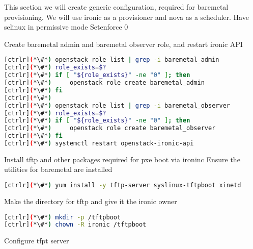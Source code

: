 This section we will create generic configuration, required for baremetal provisioning. We will use ironic as a provisioner and nova as a scheduler.
Have selinux in permissive mode
Setenforce 0

Create baremetal admin and baremetal observer role, and restart ironic API

\begin{lstlisting}[language=bash,keywords={}]
[ctrlr](*\#*) openstack role list | grep -i baremetal_admin
[ctrlr](*\#*) role_exists=$?
[ctrlr](*\#*) if [ "${role_exists}" -ne "0" ]; then 
[ctrlr](*\#*)     openstack role create baremetal_admin
[ctrlr](*\#*) fi
[ctrlr](*\#*) 
[ctrlr](*\#*) openstack role list | grep -i baremetal_observer 
[ctrlr](*\#*) role_exists=$?
[ctrlr](*\#*) if [ "${role_exists}" -ne "0" ]; then
[ctrlr](*\#*)     openstack role create baremetal_observer
[ctrlr](*\#*) fi
[ctrlr](*\#*) systemctl restart openstack-ironic-api
\end{lstlisting}

Install tftp and other packages required for pxe boot via ironinc
Ensure the utilities for baremetal are installed

\begin{lstlisting}[language=bash,keywords={}]
[ctrlr](*\#*) yum install -y tftp-server syslinux-tftpboot xinetd
\end{lstlisting}

Make the directory for tftp and give it the ironic owner

\begin{lstlisting}[language=bash,keywords={}]
[ctrlr](*\#*) mkdir -p /tftpboot
[ctrlr](*\#*) chown -R ironic /tftpboot
\end{lstlisting}

Configure tfpt server

